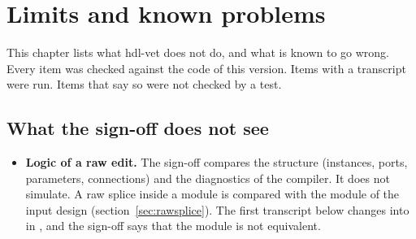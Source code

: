 \chapter{Limits and known problems}
\label{ch:limits}

This chapter lists what hdl-vet does not do, and what is known to go wrong. Every
item was checked against the code of this version. Items with a transcript were run.
Items that say so were not checked by a test.

\section{What the sign-off does not see}

\begin{itemize}
\item \textbf{Logic of a raw edit.} The sign-off compares the structure (instances,
  ports, parameters, connections) and the diagnostics of the compiler. It does not
  simulate. A raw splice inside a module is compared with the module of the input design
  (section~\ref{sec:rawsplice}). The first transcript below changes 
  into  in , and the sign-off says that the module is
  not equivalent.


\end{itemize}
